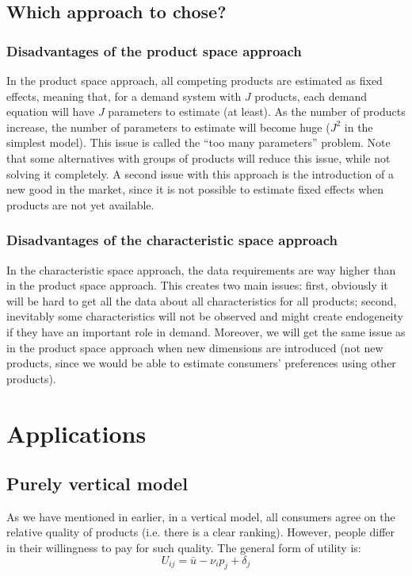 \subsection{Which approach to chose?}

\subsubsection{Disadvantages of the product space approach}

In the product space approach, all competing products are estimated as fixed effects, meaning that, for a demand system with $J$ products, each demand equation will have $J$ parameters to estimate (at least). As the number of products increase, the number of parameters to estimate will become huge ($J^2$ in the simplest model). This issue is called the ``too many parameters'' problem. Note that some alternatives with groups of products will reduce this issue, while not solving it completely. A second issue with this approach is the introduction of a new good in the market, since it is not possible to estimate fixed effects when products are not yet available.

\subsubsection{Disadvantages of the characteristic space approach}
 
In the characteristic space approach, the data requirements are way higher than in the product space approach. This creates two main issues: first, obviously it will be hard to get all the data about all characteristics for all products; second, inevitably some characteristics will not be observed and might create endogeneity if they have an important role in demand. Moreover, we will get the same issue as in the product space approach when new dimensions are introduced (not new products, since we would be able to estimate consumers' preferences using other products).

\section{Applications}

\subsection{Purely vertical model}

As we have mentioned in earlier, in a vertical model, all consumers agree on the relative quality of products (i.e. there is a clear ranking). However, people differ in their willingness to pay for such quality. The general form of utility is: $$U_{ij} = \bar u - \nu_i p_j + \delta_j $$


